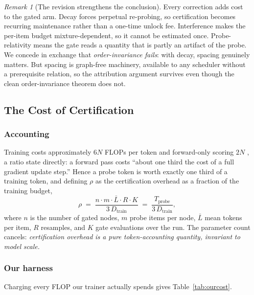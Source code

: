 \documentclass[11pt]{article}
\theoremstyle{plain}
\theoremstyle{definition}
\theoremstyle{remark}
\newtheorem*{remark}{Remark}
\begin{document}
\begin{remark}[The revision strengthens the conclusion]
Every correction adds cost to the gated arm. Decay forces perpetual
re-probing, so certification becomes recurring maintenance rather than a one-time
unlock fee. Interference makes the per-item budget mixture-dependent, so it
cannot be estimated once. Probe-relativity means the gate reads a quantity that
is partly an artifact of the probe. We concede in exchange that
\emph{order-invariance fails}: with decay, spacing genuinely matters. But spacing
is graph-free machinery, available to any scheduler without a prerequisite
relation, so the attribution argument survives even though the clean
order-invariance theorem does not.
\end{remark}

\subsection{The Cost of Certification}
\label{sec:probecost}

\subsubsection{Accounting}

Training costs approximately $6N$ FLOPs per token and forward-only scoring $2N$
\citep{kaplan2020scaling,hoffmann2022training}, a ratio \citet{biderman2023emergent}
state directly: a forward pass costs ``about one third the cost of a full
gradient update step.'' Hence a probe token is worth exactly one third of a
training token, and defining $\rho$ as the certification overhead as a fraction
of the training budget,
\begin{equation}
\rho \;=\; \frac{n \cdot m \cdot \bar{L} \cdot R \cdot K}{3\,D_{\text{train}}}
\;=\; \frac{T_{\text{probe}}}{3\,D_{\text{train}}},
\label{eq:rho}
\end{equation}
where $n$ is the number of gated nodes, $m$ probe items per node, $\bar{L}$ mean
tokens per item, $R$ resamples, and $K$ gate evaluations over the run. The
parameter count cancels: \emph{certification overhead is a pure token-accounting
quantity, invariant to model scale.}

\subsubsection{Our harness}

Charging every FLOP our trainer actually spends gives Table~\ref{tab:ourcost}.
\end{document}
